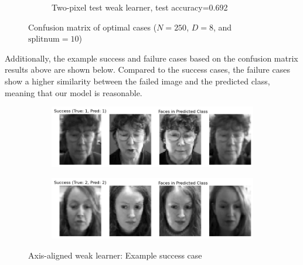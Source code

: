 \begin{figure}[h]
\begin{subfigure}[t]{0.4\linewidth}
		\caption{Two-pixel test weak learner, test accuracy=0.692}
		\label{fig:q5-fig8}
	\end{subfigure}
	\caption{Confusion matrix of optimal cases ($N=250$, $D=8$, and $\text{splitnum}=10$)}
\end{figure}

Additionally, the example success and failure cases based on the confusion matrix results above are shown below. Compared to the success cases, the failure cases show a higher similarity between the failed image and the predicted class, meaning that our model is reasonable.
\begin{figure}
	\centering
	\begin{subfigure}{0.45\linewidth}
		\centering
		\includegraphics[width=\linewidth]{image/q5-app/q5-axis-succ1.png}
	\end{subfigure}%
	\quad
	\begin{subfigure}{0.45\linewidth}
		\centering
		\includegraphics[width=\linewidth]{image/q5-app/q5-axis-succ2.png}
	\end{subfigure}
	\caption{Axis-aligned weak learner: Example success case}
\end{figure}
